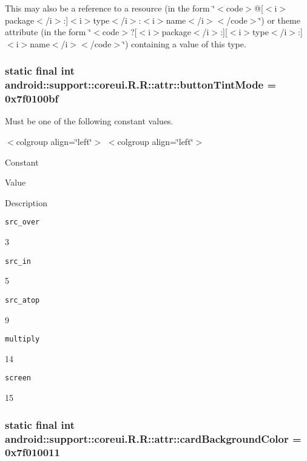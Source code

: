 This may also be a reference to a resource (in the form \char`\"{}$<$code$>$@\mbox{[}$<$i$>$package$<$/i$>$:\mbox{]}$<$i$>$type$<$/i$>$:$<$i$>$name$<$/i$>$$<$/code$>$\char`\"{}) or theme attribute (in the form \char`\"{}$<$code$>$?\mbox{[}$<$i$>$package$<$/i$>$:\mbox{]}\mbox{[}$<$i$>$type$<$/i$>$:\mbox{]}$<$i$>$name$<$/i$>$$<$/code$>$\char`\"{}) containing a value of this type. \hypertarget{classandroid_1_1support_1_1coreui_1_1_r_1_1attr_29a195090fd44ed4110b92db1cb15474}{
\subsubsection[{buttonTintMode}]{\setlength{\rightskip}{0pt plus 5cm}static final int android::support::coreui.R.R::attr::buttonTintMode = 0x7f0100bf}}
\label{classandroid_1_1support_1_1coreui_1_1_r_1_1attr_29a195090fd44ed4110b92db1cb15474}


Must be one of the following constant values. \begin{TabularC}{0}
\hline
\end{TabularC}
$<$colgroup align=\char`\"{}left\char`\"{}$>$ $<$colgroup align=\char`\"{}left\char`\"{}$>$ 

Constant

Value

Description 

{\tt src\_\-over}

3

{\tt src\_\-in}

5

{\tt src\_\-atop}

9

{\tt multiply}

14

{\tt screen}

15\hypertarget{classandroid_1_1support_1_1coreui_1_1_r_1_1attr_d42703db86ef93ba969f9dc103d1bc5d}{
\subsubsection[{cardBackgroundColor}]{\setlength{\rightskip}{0pt plus 5cm}static final int android::support::coreui.R.R::attr::cardBackgroundColor = 0x7f010011}}
\label{classandroid_1_1support_1_1coreui_1_1_r_1_1attr_d42703db86ef93ba969f9dc103d1bc5d}


